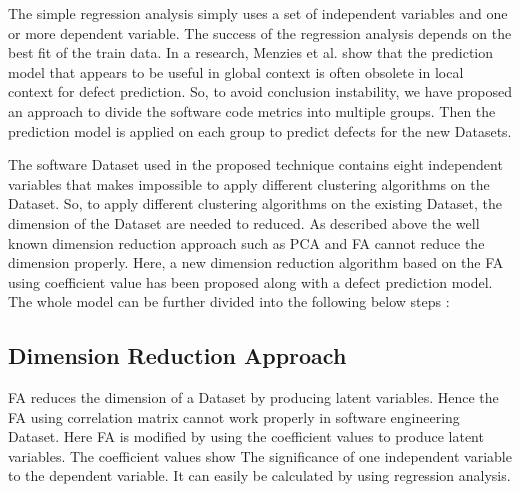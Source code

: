 \documentclass[12pt]{report}
\begin{document}

The simple regression analysis simply uses a set of independent variables and one or more dependent variable.  The success of the regression analysis depends on the best fit of the train data. In a research, Menzies et al. show that the prediction model that appears to be useful in global context is often obsolete in local context for defect prediction. So, to avoid conclusion instability, we have proposed an approach to divide the software code metrics into multiple groups. Then the prediction model is applied on each group to predict defects for the new Datasets.  

The software Dataset used in the proposed technique contains eight independent variables that makes impossible to apply different clustering algorithms on the Dataset. So, to apply different clustering algorithms on the existing Dataset, the dimension of the Dataset are needed to reduced. As described above the well known dimension reduction approach such as PCA and FA cannot reduce the dimension properly. Here, a new dimension reduction algorithm based on the FA using coefficient value has been proposed along with a defect prediction model. The whole model can be further divided into the following below steps : 

\subsection{Dimension Reduction Approach} 
 

FA reduces the dimension of a Dataset by producing latent variables. Hence the FA using correlation matrix cannot work properly in software engineering Dataset. Here FA is modified by using the coefficient values to produce latent variables. The coefficient values show The significance of one independent variable to the dependent variable. It can easily be calculated by using regression analysis. 
\end{document}
